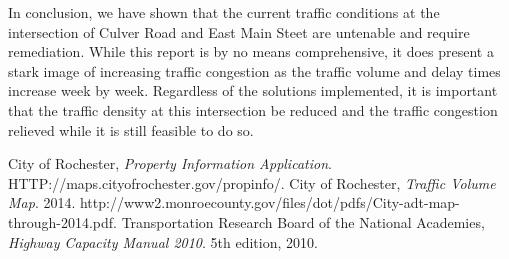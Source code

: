 \documentclass{report}
\begin{document}
In conclusion, we have shown that the current traffic conditions at the intersection of Culver Road and East Main Steet are untenable and require remediation. While this report is by no means comprehensive, it does present a stark image of increasing traffic congestion as the traffic volume and delay times increase week by week. Regardless of the solutions implemented, it is important that the traffic density at this intersection be reduced and the traffic congestion relieved while it is still feasible to do so.

\begin{thebibliography}{9}
    City of Rochester,
    \emph{Property Information Application}.
    HTTP://maps.cityofrochester.gov/propinfo/.
    City of Rochester,
    \emph{Traffic Volume Map}.
    2014.
    http://www2.monroecounty.gov/files/dot/pdfs/City-adt-map-through-2014.pdf.
    Transportation Research Board of the National Academies,
    \emph{Highway Capacity Manual 2010}.
    5th edition,
    2010.
\end{thebibliography}
\end{document}
